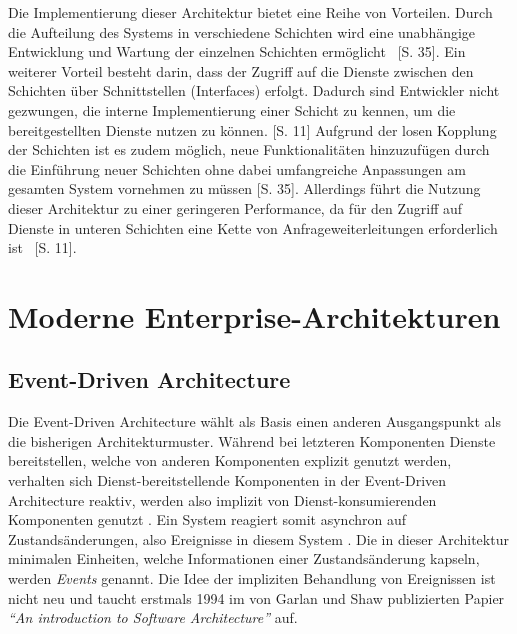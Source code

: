 \documentclass[acmtog]{acmart}
\begin{document}
Die Implementierung dieser Architektur bietet eine Reihe von Vorteilen.
Durch die Aufteilung des Systems in verschiedene Schichten wird eine unabhängige
Entwicklung und Wartung der einzelnen Schichten ermöglicht ~\cite{layered2}[S. 35].
Ein weiterer Vorteil besteht darin, dass der Zugriff auf die Dienste zwischen den
Schichten über Schnittstellen (Interfaces) erfolgt.
Dadurch sind Entwickler nicht gezwungen, die interne Implementierung einer Schicht zu kennen, um die bereitgestellten
Dienste nutzen zu können. \cite{layered4}[S. 11]
Aufgrund der losen Kopplung der Schichten ist es zudem möglich, neue Funktionalitäten
hinzuzufügen durch die Einführung neuer Schichten ohne dabei umfangreiche Anpassungen am gesamten
System vornehmen zu müssen \cite{layered2}[S. 35].
Allerdings führt die Nutzung dieser Architektur zu einer geringeren Performance, da für
den Zugriff auf Dienste in unteren Schichten eine Kette von Anfrageweiterleitungen erforderlich ist ~\cite{layered4}[S. 11].
\section{Moderne Enterprise-Architekturen}

\subsection{Event-Driven Architecture}
Die Event-Driven Architecture wählt als Basis einen anderen Ausgangspunkt als die bisherigen Architekturmuster.
Während bei letzteren Komponenten Dienste bereitstellen, welche von anderen Komponenten explizit genutzt werden,
verhalten sich Dienst-bereitstellende Komponenten in der Event-Driven Architecture reaktiv,
werden also implizit von Dienst-konsumierenden Komponenten genutzt \cite{garlanShawImplizit}.
Ein System reagiert somit asynchron auf Zustandsänderungen, also Ereignisse in diesem System \cite{eda}.
Die in dieser Architektur minimalen Einheiten, welche Informationen einer Zustandsänderung kapseln, werden \textit{Events} genannt.
Die Idee der impliziten Behandlung von Ereignissen ist nicht neu und taucht erstmals 1994 im von Garlan und Shaw publizierten Papier
\textit{\enquote{An introduction to Software Architecture}} auf.
\end{document}
